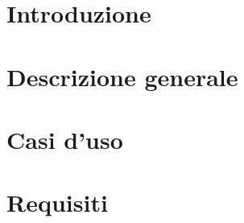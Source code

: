\documentclass[11pt,a4paper]{article}
\begin{document}
	\section{Introduzione}
			
		\newpage	
	\section{Descrizione generale}
		
		
		\newpage	
	\section{Casi d'uso}
		
		
		
		\newpage	
	\section{Requisiti}
		
		
		
\end{document}
